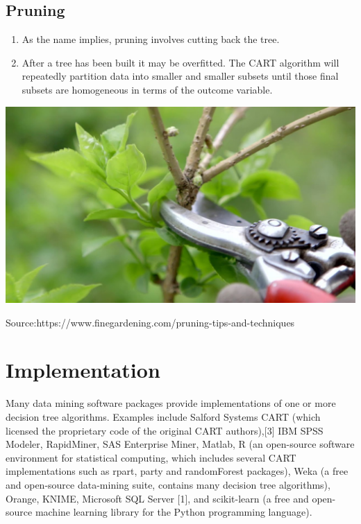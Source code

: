 \documentclass[a0,portrait]{a0poster}
\begin{document}
\begin{multicols}{3}
\subsection*{Pruning}
\begin{enumerate}
\item  As the name implies, pruning involves cutting back the tree. 
\item After a tree has been built it may be overfitted. The CART algorithm will repeatedly partition data into smaller and smaller subsets until those final subsets are homogeneous in terms of the outcome variable.
\end{enumerate}
\begin{center}\vspace{1cm}
\includegraphics[width=1.0\linewidth]{prune.jpg}
\caption*{Source:https://www.finegardening.com/pruning-tips-and-techniques}
\end{center}


\color{SaddleBrown} %

\section*{Implementation}
Many data mining software packages provide implementations of one or more decision tree algorithms.
Examples include Salford Systems CART (which licensed the proprietary code of the original CART authors),[3] IBM SPSS Modeler, RapidMiner, SAS Enterprise Miner, Matlab, R (an open-source software environment for statistical computing, which includes several CART implementations such as rpart, party and randomForest packages), Weka (a free and open-source data-mining suite, contains many decision tree algorithms), Orange, KNIME, Microsoft SQL Server [1], and scikit-learn (a free and open-source machine learning library for the Python programming language).
\color{Black} %


\end{multicols}
\end{document}
